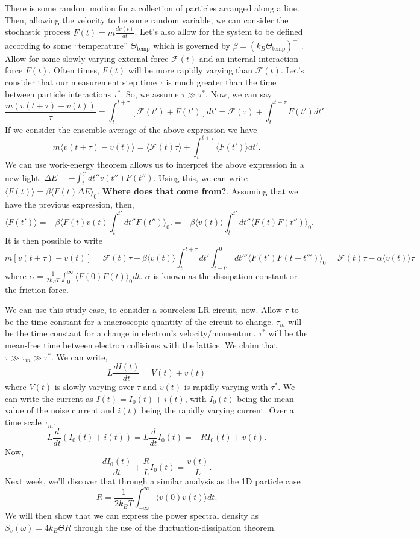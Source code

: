 \documentclass{article}
\begin{document}
There is some random motion for a collection of particles arranged along a line.
Then, allowing the velocity to be some random variable, we can consider the
stochastic process $ F(t) = m \frac{d v(t)}{dt} $. Let's also allow for the
system to be defined according to some ``temperature'' $ \Theta_{\text{temp}}$
which is governed by $ \beta = \left( k_{B} \Theta_{\text{temp}} \right)^{-1} $.
Allow for some slowly-varying external force $ \mathcal{F}(t) $ and an internal
interaction force $ F(t) $.  Often times, $ F(t) $ will be more rapidly varying
than $ \mathcal{F}(t) $.  Let's consider that our measurement step time $ \tau $
is much greater than the time between particle interactions $ \tau^{*} $. So, we
assume $ \tau \gg \tau^{*} $. Now, we can say
\[
   \frac{m \left( v(t+\tau) - v(t) \right)}{\tau}
   = \int_{t}^{t+\tau} \left[ \mathcal{F}(t') + F(t') \right] dt'
   = \mathcal{F}(\tau) + \int_{t}^{t+\tau}F(t')dt'
\]
If we consider the ensemble average of the above expression we have
\[
   m \langle v(t+\tau) - v(t) \rangle
   = \langle \mathcal{F}(t)\tau \rangle + \int_{t}^{t+\tau} \langle F(t')
   \rangle dt'.
\]
We can use  work-energy theorem allows us to interpret the above expression in a
new light: $ \Delta E = -\int_{t}^{t'}dt'' v(t'')F(t'') $. Using this, we can
write $ \langle F(t) \rangle = \beta \langle F(t) \Delta E \rangle_0 $.
\textbf{Where does that come from?}. Assuming that we have the previous
expression, then,
\[
   \langle F(t') \rangle
   = -\beta \langle F(t) v(t) \int_{t}^{t'}dt'' F(t'') \rangle_{0}.
   = -\beta \langle v(t) \rangle \int_{t}^{t'}dt'' \langle F(t) F(t'')
   \rangle_{0}.
\]
It is then possible to write
\[
   m \left[ v(t+\tau) - v(t) \right]
   = \mathcal{F}(t)\tau - \beta \langle v(t) \rangle \int_{t}^{t+\tau}dt'
   \int_{t-t'}^{0} dt''' \langle F(t')F(t+t''') \rangle_{0}
   = \mathcal{F}(t)\tau - \alpha \langle v(t) \rangle \tau
\]
where $ \alpha = \frac{1}{2 k_{B}T } \int_{0}^{\infty} \langle F(0) F(t)
\rangle_{0} dt$. $ \alpha $ is known as the dissipation constant or the friction
force.

We can use this study case, to consider a sourceless LR circuit, now. Allow $ \tau $ to be
the time constant for a macroscopic quantity of the circuit to change.
$\tau_{m}$ will be the time constant for a change in electron's
velocity/momentum. $ \tau^{*} $ will be the mean-free time between electron
collisions with the lattice. We claim that $ \tau \gg \tau_{m} \gg \tau^{*} $.
We can write,
\[
   L \frac{dI(t)}{dt} = V(t) + v(t)
\]
where $ V(t) $ is slowly varying over $ \tau $ and $ v(t) $ is rapidly-varying
with $ \tau^{*} $. We can write the current as $ I(t) = I_{0}(t) + i(t) $, with
$ I_{0}(t) $ being the mean value of the noise current and $ i(t) $ being the
rapidly varying current. Over a time scale $ \tau_{m} $,
\[
   L \frac{d}{dt} \left( I_{0}(t) + i(t) \right) = L \frac{d}{dt}I_{0}(t) = -R
   I_{0}(t) + v(t).
\]
Now,
\[
   \frac{d I_{0}(t)}{dt} + \frac{R}{L} I_{0}(t) = \frac{v(t)}{L}.
\]
Next week, we'll discover that through a similar analysis as the 1D particle
case
\[
   R = \frac{1}{2 k_{B}T}\int_{-\infty}^{\infty} \langle v(0) v(t) \rangle dt.
\]
We will then show that we can express the power spectral density as $ S_{v}(\omega)
= 4 k_{B} \Theta R $ through the use of the fluctuation-dissipation theorem.
\end{document}
